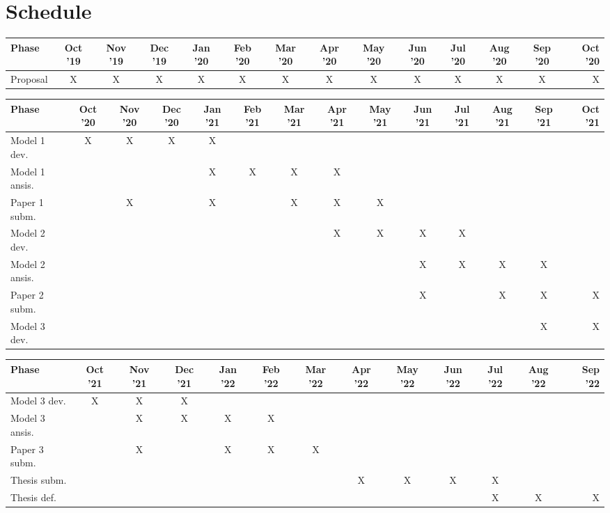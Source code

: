 \documentclass{article}
\begin{document}
\section{Schedule}

\begin{sidewaystable}[ht!]
\centering
{}
\begin{tabular}{ l*{12}{c}r } 
 \hline
 Phase & Oct '19 & Nov '19 & Dec '19 & Jan '20 & Feb '20 & Mar '20 & Apr '20 & May '20 & Jun '20 & Jul '20 & Aug '20 & Sep '20 & Oct '20 \\
 \hline
 Proposal & X & X & X & X & X & X & X & X & X & X & X & X & X \\
 \hline
\end{tabular}
\hspace{\parskip}
\begin{tabular}{ l*{12}{c}r  } 
 \hline
 Phase & Oct '20 & Nov '20 & Dec '20 & Jan '21 & Feb '21 & Mar '21 & Apr '21 & May '21 & Jun '21 & Jul '21 & Aug '21 & Sep '21 & Oct '21 \\
 \hline
 Model 1 dev. & X & X & X & X & & & & & & & & & \\
 Model 1 ansis. &  &  &  & X & X & X & X & & & & & & \\
 Paper 1 subm. &  & X &  & X & & X & X & X & & & & & \\
 Model 2 dev. & & & & & & & X & X & X & X & & & \\
 Model 2 ansis. &  & & & & & & & & X & X & X & X & \\
 Paper 2 subm. & & & & & & & & & X & & X & X & X \\
 Model 3 dev. & & & & & & & & & & & & X & X \\
 \hline
\end{tabular}
\hspace{\parskip}
\begin{tabular}{ l*{11}{c}r  } 
 \hline
 Phase & Oct '21 & Nov '21 & Dec '21 & Jan '22 & Feb '22 & Mar '22 & Apr '22 & May '22 & Jun '22 & Jul '22 & Aug '22 & Sep '22\\
 \hline
 Model 3 dev. & X & X & X & & & & & & & & & \\
 Model 3 ansis. &  & X & X & X & X & & & & & & & \\
 Paper 3 subm. &  & X &  & X & X & X & & & & & & \\
 Thesis subm. & & & & & & & X & X & X & X & & \\
 Thesis def. &  & & & & & & & & & X & X & X \\
 \hline
\end{tabular}
\end{sidewaystable}

\clearpage



\end{document}

